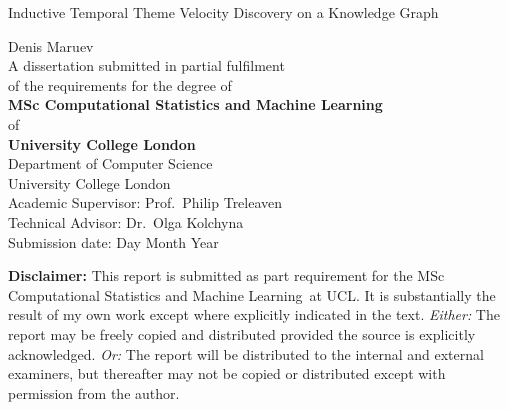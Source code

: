 \documentclass[a4paper,12pt]{report}
\newcommand{\thesistitle}{Inductive Temporal Theme Velocity Discovery on a Knowledge Graph}
\newcommand{\thesisauthor}{Denis Maruev}
\newcommand{\thesisdegree}{MSc Computational Statistics and Machine Learning}
\newcommand{\thesissupervisor}{Prof.\ Philip Treleaven}
\newcommand{\thesisadvisor}{Dr.\ Olga Kolchyna}      %
\newcommand{\submissiondate}{Day Month Year}
\begin{document}
\onehalfspacing

\begin{titlepage}
\begin{center}

{\Huge \thesistitle}\\[0.4cm]
\vspace{2cm}

{\Large \thesisauthor}\\[1.5cm]

A dissertation submitted in partial fulfilment\\
of the requirements for the degree of\\[0.3cm]
{\bf \thesisdegree}\\
of\\
{\bf University College London}\\[2cm]

Department of Computer Science\\
University College London\\[1cm]

Academic Supervisor: \thesissupervisor\\
Technical Advisor: \thesisadvisor\\[1cm]

Submission date: \submissiondate
\end{center}

\vfill
\footnotesize
{\bf Disclaimer:}
This report is submitted as part requirement for the \thesisdegree\ at UCL.
It is substantially the result of my own work except where explicitly
indicated in the text.
\emph{Either:} The report may be freely copied and distributed provided the
source is explicitly acknowledged.
\emph{Or:} The report will be distributed to the internal and external
examiners, but thereafter may not be copied or distributed except with
permission from the author.
\end{titlepage}

\end{document}
